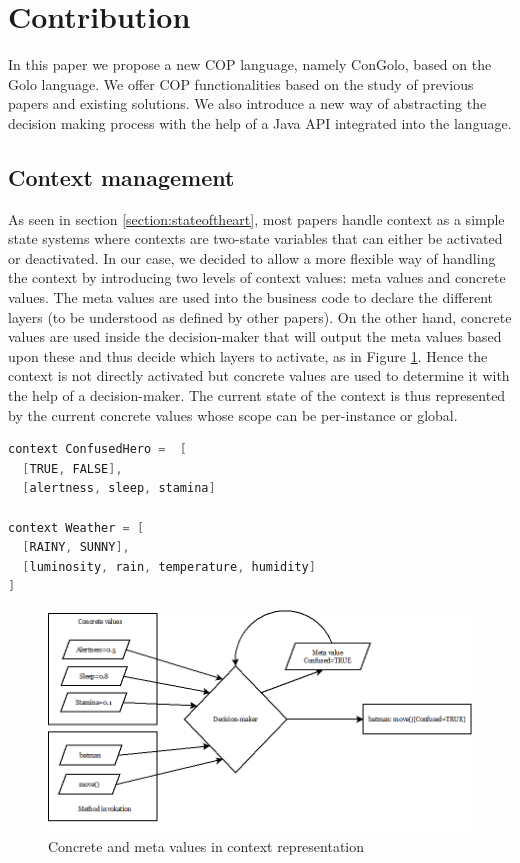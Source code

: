 \documentclass[a4paper]{article}
\begin{document}
  \section{Contribution}

\label{section:contribution}

In this paper we propose a new COP language, namely ConGolo, based on the Golo language. We offer COP functionalities based on the study of previous papers and existing solutions. We also introduce a new way of abstracting the decision making process with the help of a Java API integrated into the language.

\subsection{Context management}
\label{subsection:contextmanagement}

As seen in section \ref{section:stateoftheart}, most papers handle context as a simple state systems where contexts are two-state variables that can either be activated or deactivated. In our case, we decided to allow a more flexible way of handling the context by introducing two levels of context values: meta values and concrete values. The meta values are used into the business code to declare the different layers (to be understood as defined by other papers). On the other hand, concrete values are used inside the decision-maker that will output the meta values based upon these and thus decide which layers to activate, as in Figure \ref{figure:concretemetavalues}. Hence the context is not directly activated but concrete values are used to determine it with the help of a decision-maker. The current state of the context is thus represented by the current concrete values whose scope can be per-instance or global.

\begin{lstlisting}[float, language=Java, caption=ConGolo context example, label={listing:congolocontext}]
context ConfusedHero =  [
  [TRUE, FALSE],
  [alertness, sleep, stamina]

context Weather = [
  [RAINY, SUNNY],
  [luminosity, rain, temperature, humidity]
]
\end{lstlisting}

\begin{center}
\begin{figure}
\centering
\includegraphics[width=0.9\columnwidth]{images/concrete-meta-values.png}
\caption{Concrete and meta values in context representation}
\label{figure:concretemetavalues}
\end{figure}
\end{center}
\end{document}

